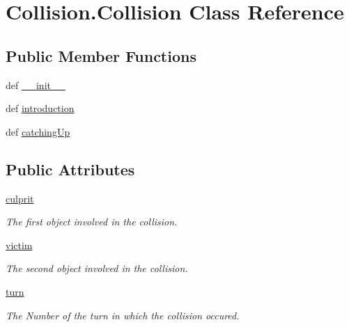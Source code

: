 \hypertarget{classCollision_1_1Collision}{\section{\-Collision.\-Collision \-Class \-Reference}
\label{classCollision_1_1Collision}
}
\subsection*{\-Public \-Member \-Functions}
\begin{DoxyCompactItemize}
\item 
def \hyperlink{classCollision_1_1Collision_a4acfcbd4a12cc49011e1565f4f4d4d84}{\-\_\-\-\_\-init\-\_\-\-\_\-}
\item 
def \hyperlink{classCollision_1_1Collision_a3d88b2d02247db3b7009b0674e249fee}{introduction}
\item 
def \hyperlink{classCollision_1_1Collision_a0d785c437c39344795e22413e14c486c}{catching\-Up}
\end{DoxyCompactItemize}
\subsection*{\-Public \-Attributes}
\begin{DoxyCompactItemize}
\item 
\hypertarget{classCollision_1_1Collision_ad0bf12b64094d6d47eebd2f09c14daed}{\hyperlink{classCollision_1_1Collision_ad0bf12b64094d6d47eebd2f09c14daed}{culprit}}\label{classCollision_1_1Collision_ad0bf12b64094d6d47eebd2f09c14daed}

\begin{DoxyCompactList}\small\item\em \-The first object involved in the collision. \end{DoxyCompactList}\item 
\hypertarget{classCollision_1_1Collision_ae9b952cce23fa8dcc4dcaf3c10db8332}{\hyperlink{classCollision_1_1Collision_ae9b952cce23fa8dcc4dcaf3c10db8332}{victim}}\label{classCollision_1_1Collision_ae9b952cce23fa8dcc4dcaf3c10db8332}

\begin{DoxyCompactList}\small\item\em \-The second object involved in the collision. \end{DoxyCompactList}\item 
\hypertarget{classCollision_1_1Collision_a01d99d59d7e43d843c90e40413878105}{\hyperlink{classCollision_1_1Collision_a01d99d59d7e43d843c90e40413878105}{turn}}\label{classCollision_1_1Collision_a01d99d59d7e43d843c90e40413878105}

\begin{DoxyCompactList}\small\item\em \-The \-Number of the turn in which the collision occured. \end{DoxyCompactList}\end{DoxyCompactItemize}


